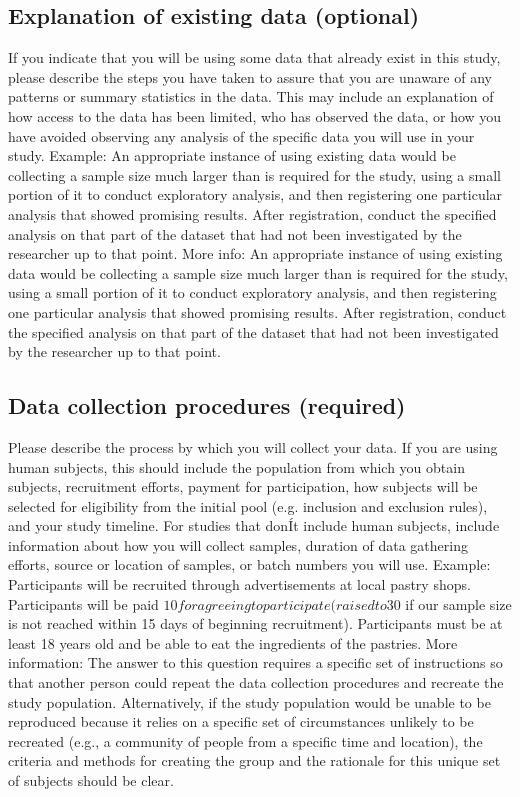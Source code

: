 \documentclass[
10pt, %
a4paper, %
oneside, %
headinclude,footinclude, %
BCOR5mm, %
]{scrartcl}
\begin{document}
\subsection{Explanation of existing data (optional)}
If you indicate that you will be using some data that already exist in this study, please describe the steps you have taken to assure that you are unaware of any patterns or summary statistics in the data. This may include an explanation of how access to the data has been limited, who has observed the data, or how you have avoided observing any analysis of the specific data you will use in your study. 
Example: An appropriate instance of using existing data would be collecting a sample size much larger than is required for the study, using a small portion of it to conduct exploratory analysis, and then registering one particular analysis that showed promising results. After registration, conduct the specified analysis on that part of the dataset that had not been investigated by the researcher up to that point. 
More info: An appropriate instance of using existing data would be collecting a sample size much larger than is required for the study, using a small portion of it to conduct exploratory analysis, and then registering one particular analysis that showed promising results. After registration, conduct the specified analysis on that part of the dataset that had not been investigated by the researcher up to that point.


\subsection{Data collection procedures (required)}
Please describe the process by which you will collect your data. If you are using human subjects, this should include the population from which you obtain subjects, recruitment efforts, payment for participation, how subjects will be selected for eligibility from the initial pool (e.g. inclusion and exclusion rules), and your study timeline. For studies that donÍt include human subjects, include information about how you will collect samples, duration of data gathering efforts, source or location of samples, or batch numbers you will use. 
Example: Participants will be recruited through advertisements at local pastry shops. Participants will be paid $10 for agreeing to participate (raised to $30 if our sample size is not reached within 15 days of beginning recruitment). Participants must be at least 18 years old and be able to eat the ingredients of the pastries.
More information: The answer to this question requires a specific set of instructions so that another person could repeat the data collection procedures and recreate the study population. Alternatively, if the study population would be unable to be reproduced because it relies on a specific set of circumstances unlikely to be recreated (e.g., a community of people from a specific time and location), the criteria and methods for creating the group and the rationale for this unique set of subjects should be clear.
\end{document}
